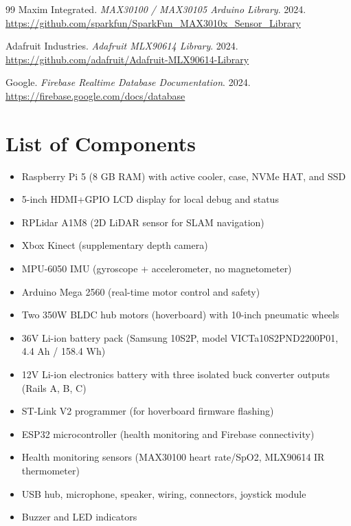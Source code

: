 \documentclass[12pt,a4paper]{report}
\begin{document}
\begin{singlespace}
\begin{thebibliography}{99}
Maxim Integrated.
\textit{MAX30100 / MAX30105 Arduino Library}.
2024.
\newline
\url{https://github.com/sparkfun/SparkFun_MAX3010x_Sensor_Library}

Adafruit Industries.
\textit{Adafruit MLX90614 Library}.
2024.
\newline
\url{https://github.com/adafruit/Adafruit-MLX90614-Library}

Google.
\textit{Firebase Realtime Database Documentation}.
2024.
\newline
\url{https://firebase.google.com/docs/database}

\end{thebibliography}
\end{singlespace}

\appendix

\chapter{List of Components}

\begin{itemize}
    \item Raspberry Pi 5 (8 GB RAM) with active cooler, case, NVMe HAT, and SSD
    \item 5-inch HDMI+GPIO LCD display for local debug and status
    \item RPLidar A1M8 (2D LiDAR sensor for SLAM navigation)
    \item Xbox Kinect (supplementary depth camera)
    \item MPU-6050 IMU (gyroscope + accelerometer, no magnetometer)
    \item Arduino Mega 2560 (real-time motor control and safety)
    \item Two 350W BLDC hub motors (hoverboard) with 10-inch pneumatic wheels
    \item 36V Li-ion battery pack (Samsung 10S2P, model VICTa10S2PND2200P01, 4.4 Ah / 158.4 Wh)
    \item 12V Li-ion electronics battery with three isolated buck converter outputs (Rails A, B, C)
    \item ST-Link V2 programmer (for hoverboard firmware flashing)
    \item ESP32 microcontroller (health monitoring and Firebase connectivity)
    \item Health monitoring sensors (MAX30100 heart rate/SpO2, MLX90614 IR thermometer)
    \item USB hub, microphone, speaker, wiring, connectors, joystick module
    \item Buzzer and LED indicators
\end{itemize}
\end{document}
